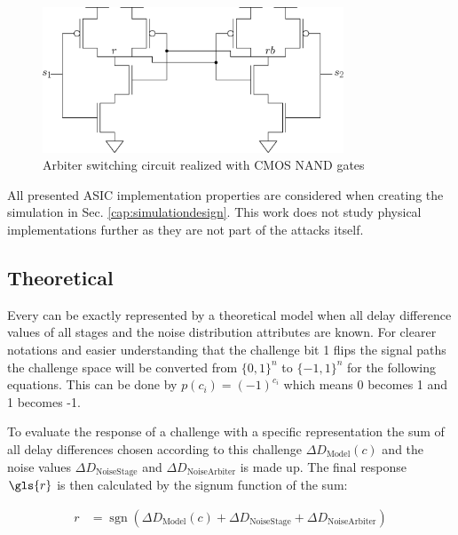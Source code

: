 \begin{figure}[ht]
\centering
\includegraphics[width=0.80\textwidth]{images/arbiter_circuit.eps}
\caption{Arbiter switching circuit realized with \ac{CMOS} NAND gates}
\label{fig:nandarbiter}
\end{figure}

All presented \apuf \ac{ASIC} implementation properties are considered when creating the \apuf simulation in Sec. \ref{cap:simulationdesign}.
This work does not study physical \apuf implementations further as they are not part of the attacks itself.


\subsection{Theoretical}
\label{sec:theoretical}

Every \apuf can be exactly represented by a theoretical model when all delay difference values of all stages and the noise distribution attributes are known.
For clearer notations and easier understanding that the challenge bit 1 flips the signal paths the challenge space will be converted from $\{0, 1\}^n$ to $\{-1, 1\}^n$ for the following equations.
This can be done by $p(c_i) = (-1)^{c_i}$ which means 0 becomes 1 and 1 becomes -1.

To evaluate the response of a challenge with a specific \puf representation the sum of all delay differences chosen according to this challenge $\Delta D_{\mathrm{Model}}(c)$ and the noise values $\Delta D_{\mathrm{Noise Stage}}$ and $\Delta D_{\mathrm{Noise Arbiter}}$ is made up.
The final response $\gls{r}$ is then calculated by the signum function of the sum:

\begin{align*}
r &= \operatorname{sgn}(\Delta D_{\mathrm{Model}}(c) + \Delta D_{\mathrm{Noise Stage}} + \Delta D_{\mathrm{Noise Arbiter}})
\end{align*}

